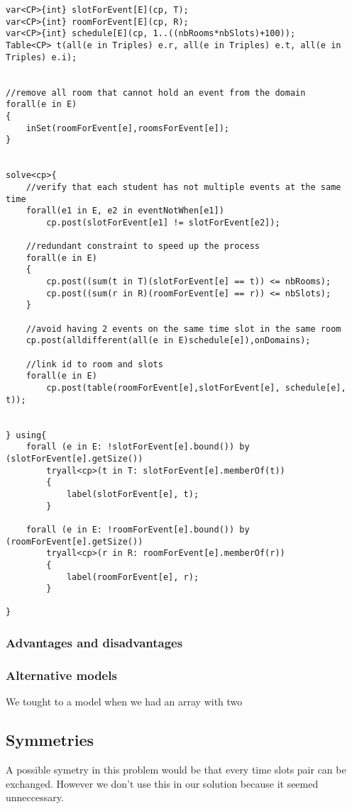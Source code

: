\documentclass{eplDoc}
\begin{document}
\begin{lstlisting}
var<CP>{int} slotForEvent[E](cp, T);
var<CP>{int} roomForEvent[E](cp, R);
var<CP>{int} schedule[E](cp, 1..((nbRooms*nbSlots)+100));
Table<CP> t(all(e in Triples) e.r, all(e in Triples) e.t, all(e in Triples) e.i);


//remove all room that cannot hold an event from the domain
forall(e in E)
{
    inSet(roomForEvent[e],roomsForEvent[e]);
}


solve<cp>{
    //verify that each student has not multiple events at the same time
    forall(e1 in E, e2 in eventNotWhen[e1])
        cp.post(slotForEvent[e1] != slotForEvent[e2]);

    //redundant constraint to speed up the process
    forall(e in E)
    {
        cp.post((sum(t in T)(slotForEvent[e] == t)) <= nbRooms);
        cp.post((sum(r in R)(roomForEvent[e] == r)) <= nbSlots);
    }

    //avoid having 2 events on the same time slot in the same room
    cp.post(alldifferent(all(e in E)schedule[e]),onDomains);

    //link id to room and slots
    forall(e in E)
        cp.post(table(roomForEvent[e],slotForEvent[e], schedule[e], t));


} using{
    forall (e in E: !slotForEvent[e].bound()) by (slotForEvent[e].getSize())
        tryall<cp>(t in T: slotForEvent[e].memberOf(t))
        {
            label(slotForEvent[e], t);
        }
    
    forall (e in E: !roomForEvent[e].bound()) by (roomForEvent[e].getSize())
        tryall<cp>(r in R: roomForEvent[e].memberOf(r))
        {
            label(roomForEvent[e], r);
        }
    
}
\end{lstlisting}

\subsubsection{Advantages and disadvantages}
\subsubsection{Alternative models}
We tought to a model when we had an array with two 

\subsection{Symmetries}

A possible symetry in this problem would be that every time slots pair can be exchanged. However we don't use this in our solution because it seemed unneccessary. 
\end{document}
